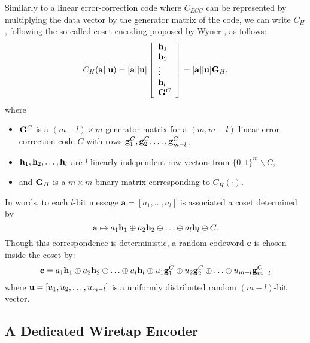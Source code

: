 \documentclass{article}[11pt]
\newcommand{\av}{\mathbf{a}}
\newcommand{\cv}{\mathbf{c}}
\begin{document}
Similarly to a linear error-correction code where $C_{ECC}$ can be
represented by multiplying the data vector by the generator matrix of the code,
we can write $C_H$, following the so-called coset encoding proposed by Wyner
\cite{wyner}, as follows:
\begin {equation}\label{eq:coset}
C_H({\bf a}|| {\bf u})=
[{\bf a}|| {\bf u}]
\left[ \begin{array}{l}
{\bf h}_1\\
{\bf h}_2\\
\vdots \\
{\bf h}_l\\
{\bf G}^C
\end{array} \right]
=
 [{\bf a}|| {\bf u}] {\bf G}_H,
\end{equation}
where
\begin{itemize}
\item
${\bf G}^C$ is a $(m-l)\times m$ generator matrix for a $(m,m-l)$ linear
error-correction code $C$ with rows
${\bf g}^C_1,{\bf g}^C_2,\ldots,{\bf g}^C_{m-l}$,
\item
${\bf h}_1,{\bf h}_2,\ldots,{\bf h}_l$ are $l$ linearly independent row
vectors from $\{ 0,1 \}^m \backslash C$,
\item
and ${\bf G}_H$ is a $m \times m$ binary matrix corresponding to
$C_H(\cdot)$.
\end{itemize}
In words, to each $l$-bit message $\av=[a_1,\ldots,a_l]$ is associated
a coset determined by
\[
{\bf a} \mapsto a_1 {\bf h}_1 \oplus a_2 {\bf h}_2 \oplus \ldots
\oplus a_l {\bf h}_l \oplus C.
\]
Though this correspondence is deterministic, a random codeword $\cv$ is
chosen inside the coset by:
\[
{\bf c} = a_1 {\bf h}_1 \oplus a_2 {\bf h}_2 \oplus \ldots \oplus a_l
{\bf h}_l \oplus u_1{\bf g}^C_1 \oplus u_2 {\bf g}^C_2 \oplus \ldots
\oplus u_{m-l} {\bf g}^C_{m-l}
\]
where ${\bf u} = [u_1, u_2,\ldots, u_{m-l}]$ is a uniformly distributed random
$(m-l)$-bit vector.



\subsection{A Dedicated Wiretap Encoder}
\label{subsec:wiretap}
\end{document}
